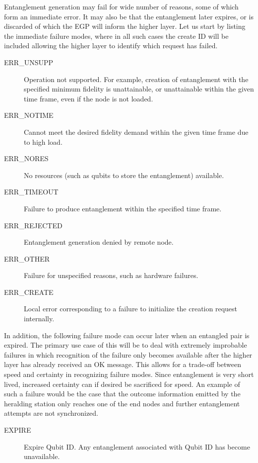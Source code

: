 \documentclass{article}
\begin{document}
Entanglement generation may fail for wide number of reasons, some of which form an immediate error. It may also be that the entanglement later expires, or is discarded
of which the EGP will inform the higher layer. Let us start by listing the immediate failure modes, where in all such cases the create ID will be included allowing the
higher layer to identify which request has failed.\\
\begin{description}
\item[ERR\_UNSUPP] Operation not supported. For example, creation of entanglement with the specified minimum fidelity is unattainable, or
unattainable within the given time frame, even if the node is not loaded.
\item[ERR\_NOTIME] Cannot meet the desired fidelity demand within the given time frame due to high load.
\item[ERR\_NORES] No resources (such as qubits to store the entanglement) available.
\item[ERR\_TIMEOUT] Failure to produce entanglement within the specified time frame.
\item[ERR\_REJECTED] Entanglement generation denied by remote node.
\item[ERR\_OTHER] Failure for unspecified reasons, such as hardware failures.
\item[ERR\_CREATE] Local error corresponding to a failure to initialize the creation request internally.
\end{description}
In addition, the following failure mode can occur later when an entangled pair is expired. The primary use case of this will be to deal with extremely improbable failures
in which recognition of the failure only becomes available after the higher layer has already received an OK message. This allows for
a trade-off between speed and certainty in recognizing failure modes. Since entanglement is very short lived, increased certainty can if desired be sacrificed for speed.
An example of such a failure would be the case that the outcome information emitted by the heralding station only reaches one
of the end nodes and further entanglement attempts are not synchronized.
\begin{description}
\item[EXPIRE] Expire Qubit ID. Any entanglement associated with Qubit ID has become unavailable.
\end{description}
\end{document}
